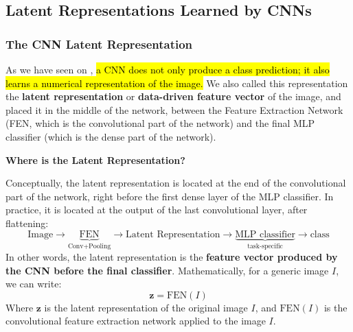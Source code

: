 \subsection{Latent Representations Learned by CNNs}\label{sec:latent-representations-learned-by-cnns}

\subsubsection{The CNN Latent Representation}\label{sec:the-cnn-latent-representation}

As we have seen on , \hl{a CNN does not only produce a class prediction; it also learns a numerical representation of the image.} We also called this representation the \textbf{latent representation} or \textbf{data-driven feature vector} of the image, and placed it in the middle of the network, between the Feature Extraction Network (FEN, which is the convolutional part of the network) and the final MLP classifier (which is the dense part of the network).

\highspace
\begin{flushleft}
    \textcolor{Green3}{ \textbf{Where is the Latent Representation?}}
\end{flushleft}
Conceptually, the latent representation is located at the end of the convolutional part of the network, right before the first dense layer of the MLP classifier. In practice, it is located at the output of the last convolutional layer, after flattening:
\begin{equation*}
    \text{Image} \to \underbrace{\text{FEN}}_{\text{Conv} + \text{Pooling}} \to \boxed{\text{Latent Representation}} \to \underbrace{\text{MLP classifier}}_{\text{task-specific}} \to \text{class}
\end{equation*}
In other words, the latent representation is the \textbf{feature vector produced by the CNN before the final classifier}. Mathematically, for a generic image $I$, we can write:
\begin{equation*}
    \mathbf{z} = \mathrm{FEN}(I)
\end{equation*}
Where $\mathbf{z}$ is the latent representation of the original image $I$, and $\mathrm{FEN}(I)$ is the convolutional feature extraction network applied to the image $I$.

